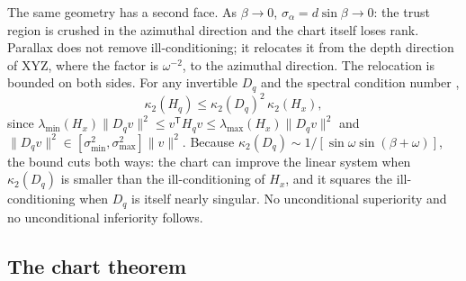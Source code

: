 \documentclass[11pt,a4paper]{article}
\let\cite\citep
\theoremstyle{definition}
\theoremstyle{remark}
\newcommand{\T}{\mathsf{T}}
\begin{document}

The same geometry has a second face. As $\beta\to0$, $\sigma_\alpha=d\sin\beta\to0$: the trust region is crushed in the azimuthal direction and the chart itself loses rank. Parallax does not remove ill-conditioning; it relocates it from the depth direction of XYZ, where the factor is $\omega^{-2}$, to the azimuthal direction. The relocation is bounded on both sides. For any invertible $D_q$ and the spectral condition number \cite{golub2013matrix},
\begin{equation}
\kappa_2(H_q)\le\kappa_2(D_q)^{2}\,\kappa_2(H_x),
\label{eq:kappa-bound}
\end{equation}
since $\lambda_{\min}(H_x)\|D_qv\|^{2}\le v^{\T}H_qv\le\lambda_{\max}(H_x)\|D_qv\|^{2}$ and $\|D_qv\|^{2}\in[\sigma_{\min}^{2},\sigma_{\max}^{2}]\|v\|^{2}$. Because $\kappa_2(D_q)\sim1/[\sin\omega\sin(\beta+\omega)]$, the bound cuts both ways: the chart can improve the linear system when $\kappa_2(D_q)$ is smaller than the ill-conditioning of $H_x$, and it squares the ill-conditioning when $D_q$ is itself nearly singular. No unconditional superiority and no unconditional inferiority follows.

\subsection{The chart theorem}
\label{sec:main-theorem}
\end{document}
